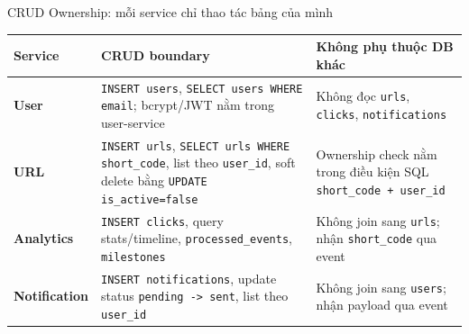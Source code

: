 \documentclass[aspectratio=169]{beamer}
\begin{document}
\begin{frame}{CRUD Ownership: mỗi service chỉ thao tác bảng của mình}
    \scriptsize
    \begin{center}
    \begin{tabular}{>{\bfseries}p{}p{}p{}}
        \toprule
        Service & CRUD boundary & Không phụ thuộc DB khác \\
        \midrule
        User & \texttt{INSERT users}, \texttt{SELECT users WHERE email}; bcrypt/JWT nằm trong user-service & Không đọc \texttt{urls}, \texttt{clicks}, \texttt{notifications} \\
        URL & \texttt{INSERT urls}, \texttt{SELECT urls WHERE short\_code}, list theo \texttt{user\_id}, soft delete bằng \texttt{UPDATE is\_active=false} & Ownership check nằm trong điều kiện SQL \texttt{short\_code + user\_id} \\
        Analytics & \texttt{INSERT clicks}, query stats/timeline, \texttt{processed\_events}, \texttt{milestones} & Không join sang \texttt{urls}; nhận \texttt{short\_code} qua event \\
        Notification & \texttt{INSERT notifications}, update status \texttt{pending -> sent}, list theo \texttt{user\_id} & Không join sang \texttt{users}; nhận payload qua event \\
        \bottomrule
    \end{tabular}
    \end{center}
\end{frame}
\end{document}
